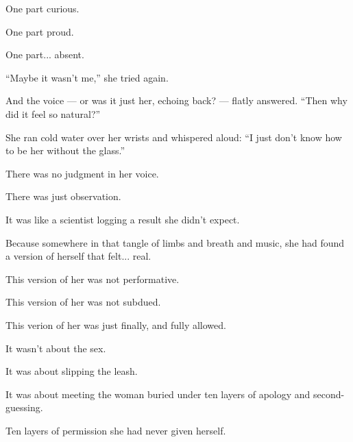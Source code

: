One part curious. 

One part proud.

One part... absent.

``Maybe it wasn’t me,'' she tried again.

And the voice --- or was it just her, echoing back? --- flatly answered.
``Then why did it feel so natural?''

She ran cold water over her wrists and whispered aloud:
``I just don’t know how to be her without the glass.''

There was no judgment in her voice. 

There was just observation. 

It was like a scientist logging a result she didn’t expect.

Because somewhere in that tangle of limbs and breath and music, she had found a 
version of herself that 
felt... real.

This version of her was not performative. 

This version of her was not subdued. 

This verion of her was just finally, and fully allowed.

It wasn’t about the sex.

It was about slipping the leash.

It was about meeting the woman buried under ten layers of apology and second-guessing.

Ten layers of permission she had never given herself.

\medskip

